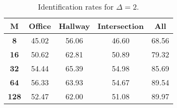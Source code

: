 \begin{table}[h]
    \footnotesize
    \centering
    \begin{tabular}{|c|c|c|c|l|}    
    \hline
    {\bf M} & {\bf Office} & {\bf Hallway} & {\bf Intersection} &     \multicolumn{1}{c|}{{\bf All}} \\ \hline
    {\bf 8} & 45.02 & 56.06 & 46.60 & 68.56 \\ \hline
    {\bf 16} & 50.62 & 62.81 & 50.89 & 79.32 \\ \hline
    {\bf 32} & 54.44 & 65.39 & 54.98 & 85.69 \\ \hline
    {\bf 64} & 56.33 & 63.93 & 54.67 & 89.54 \\ \hline
    {\bf 128} & 52.47 & 62.00 & 51.08 & 89.97 \\ \hline
    \end{tabular}
    \caption{Identification rates for $\Delta = 2$.}    
    \label{tab:identify_speakers_mit_19_2}
\end{table}
